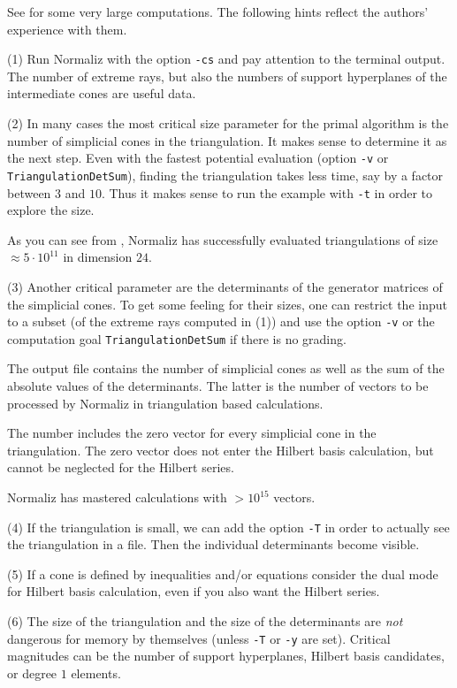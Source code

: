 \documentclass[12pt,a4paper]{scrartcl}
\theoremstyle{definition}
\def\ttt{\texttt}
\begin{document}
See \cite{BIS} for some very large computations. The following
hints reflect the authors' experience with them.

(1) Run Normaliz with the option \ttt{-cs} and pay attention
to the terminal output. The number of extreme rays, but also
the numbers of support hyperplanes of the intermediate cones
are useful data.

(2) In many cases the most critical size parameter for the primal algorithm is the
number of simplicial cones in the triangulation. It makes sense
to determine it as the next step. Even with the fastest
potential evaluation (option \ttt{-v} or \verb|TriangulationDetSum|), finding the
triangulation takes less time, say by a factor between $3$ and
$10$. Thus it makes sense to run the example with \ttt{-t} in
order to explore the size.

As you can see from \cite{BIS}, Normaliz has successfully
evaluated triangulations of size $\approx 5\cdot 10^{11}$ in
dimension $24$.

(3) Another critical parameter are the determinants of the
generator matrices of the simplicial cones. To get some feeling
for their sizes, one can restrict the input to a subset (of the
extreme rays computed in (1)) and use the option \ttt{-v} or the computation goal \verb|TriangulationDetSum| if there is no grading.

The output file contains the number of simplicial cones as well
as the sum of the absolute values of the determinants. The
latter is the number of vectors to be processed by Normaliz
in triangulation based calculations.

The number includes the zero vector for every simplicial cone
in the triangulation. The zero vector does not enter the
Hilbert basis calculation, but cannot be neglected for the
Hilbert series.

Normaliz has mastered calculations with $> 10^{15}$ vectors.

(4) If the triangulation is small, we can add the option
\ttt{-T} in order to actually see the triangulation in a file.
Then the individual determinants become visible.

(5) If a cone is defined by inequalities and/or equations
consider the dual mode for Hilbert basis calculation, even if
you also want the Hilbert series.

(6) The size of the triangulation and the size of the
determinants are \emph{not} dangerous for memory by themselves
(unless \ttt{-T} or \ttt{-y} are set). Critical magnitudes can
be the number of support hyperplanes, Hilbert basis candidates,
or degree $1$ elements.
\end{document}
